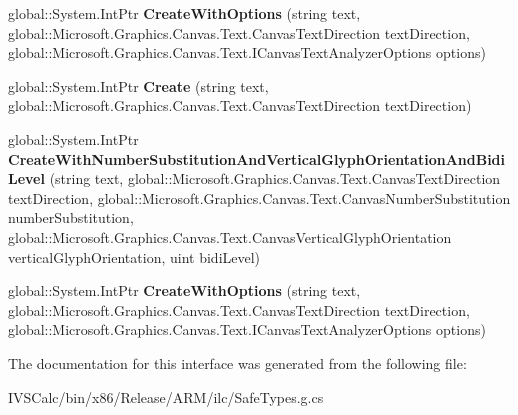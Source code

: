 \begin{DoxyCompactItemize}
global\+::\+System.\+Int\+Ptr {\bfseries Create\+With\+Options} (string text, global\+::\+Microsoft.\+Graphics.\+Canvas.\+Text.\+Canvas\+Text\+Direction text\+Direction, global\+::\+Microsoft.\+Graphics.\+Canvas.\+Text.\+I\+Canvas\+Text\+Analyzer\+Options options)
\item 
\mbox{\label{interface_microsoft_1_1_graphics_1_1_canvas_1_1_text_1_1_i_canvas_text_analyzer_factory_aec5674841ed2329598eb2ed3e89170f7}} 
global\+::\+System.\+Int\+Ptr {\bfseries Create} (string text, global\+::\+Microsoft.\+Graphics.\+Canvas.\+Text.\+Canvas\+Text\+Direction text\+Direction)
\item 
\mbox{\label{interface_microsoft_1_1_graphics_1_1_canvas_1_1_text_1_1_i_canvas_text_analyzer_factory_ab3d7e254f0ceac4bdd660a9922c725f7}} 
global\+::\+System.\+Int\+Ptr {\bfseries Create\+With\+Number\+Substitution\+And\+Vertical\+Glyph\+Orientation\+And\+Bidi\+Level} (string text, global\+::\+Microsoft.\+Graphics.\+Canvas.\+Text.\+Canvas\+Text\+Direction text\+Direction, global\+::\+Microsoft.\+Graphics.\+Canvas.\+Text.\+Canvas\+Number\+Substitution number\+Substitution, global\+::\+Microsoft.\+Graphics.\+Canvas.\+Text.\+Canvas\+Vertical\+Glyph\+Orientation vertical\+Glyph\+Orientation, uint bidi\+Level)
\item 
\mbox{\label{interface_microsoft_1_1_graphics_1_1_canvas_1_1_text_1_1_i_canvas_text_analyzer_factory_a40e77ae7b0745b17858257c35808df74}} 
global\+::\+System.\+Int\+Ptr {\bfseries Create\+With\+Options} (string text, global\+::\+Microsoft.\+Graphics.\+Canvas.\+Text.\+Canvas\+Text\+Direction text\+Direction, global\+::\+Microsoft.\+Graphics.\+Canvas.\+Text.\+I\+Canvas\+Text\+Analyzer\+Options options)
\end{DoxyCompactItemize}


The documentation for this interface was generated from the following file\+:\begin{DoxyCompactItemize}
\item 
I\+V\+S\+Calc/bin/x86/\+Release/\+A\+R\+M/ilc/Safe\+Types.\+g.\+cs\end{DoxyCompactItemize}
